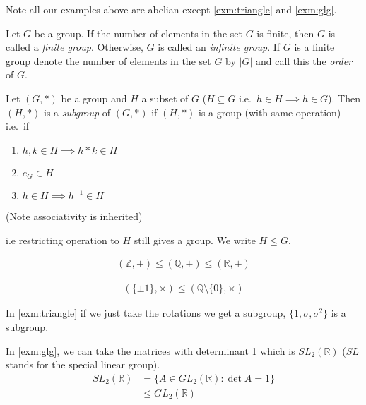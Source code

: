 Note all our examples above are abelian except \ref{exm:triangle} and \ref{exm:glg}.

\begin{definition}
Let \(G\) be a group. If the number of elements in the set \(G\) is finite, then \(G\) is called a \emph{finite group}. Otherwise, \(G\) is called an \emph{infinite group}. If \(G\) is a finite group denote the number of elements in the set \(G\) by \(|G|\) and call this the \emph{order} of \(G\).
\end{definition}

\begin{definition}
Let \((G, *)\) be a group and \(H\) a subset of \(G\) (\(H \subseteq G\) i.e.~\(h \in H \implies h \in G\)). Then \((H, *)\) is a \emph{subgroup} of \((G, *)\) if \((H, *)\) is a group (with same operation) i.e.~if

\begin{enumerate}
\def\labelenumi{\alph{enumi})}
\tightlist
\item
  \(h, k \in H \implies h * k \in H\)
\item
  \(e_G \in H\)
\item
  \(h \in H \implies h^{-1} \in H\)
\end{enumerate}

(Note associativity is inherited)

i.e restricting operation to \(H\) still gives a group. We write \(H \leq G\).
\end{definition}

\begin{example}
\begin{align*}
    (\mathbb{Z}, +) \leq (\mathbb{Q}, +) \leq (\mathbb{R}, +)
\end{align*}
\end{example}

\begin{example}
\begin{align*}
    (\{\pm 1\}, \times) \leq (\mathbb{Q} \setminus \{ 0 \}, \times) 
\end{align*}
\end{example}

\begin{example}
In \ref{exm:triangle} if we just take the rotations we get a subgroup, \(\{ 1, \sigma, \sigma^2 \}\) is a subgroup.
\end{example}

\begin{example}
\protect\hypertarget{exm:sltwo}{}\label{exm:sltwo}In \ref{exm:glg}, we can take the matrices with determinant 1 which is \(SL_2(\mathbb{R})\) (\(SL\) stands for the special linear group).
\begin{align*}
    SL_2(\mathbb{R}) &= \{ A \in GL_2(\mathbb{R}) : \det A = 1 \} \\
    &\leq GL_2(\mathbb{R})
\end{align*}
\end{example}

